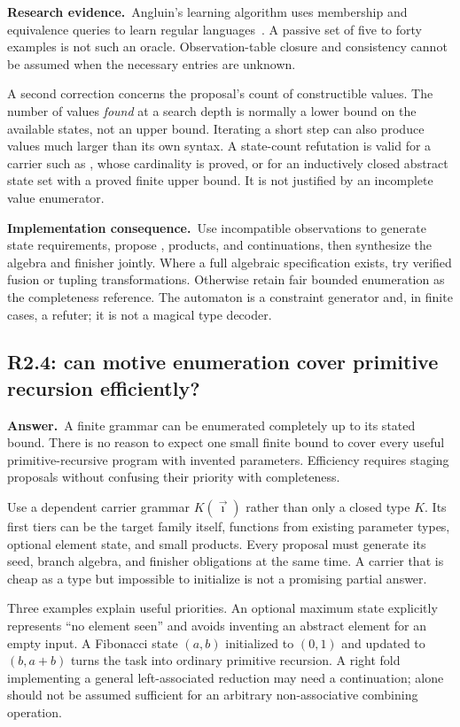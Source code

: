 \documentclass[11pt,a4paper]{article}
\theoremstyle{definition}
\theoremstyle{remark}
\newcommand{\code}[1]{\texttt{\detokenize{#1}}}
\newcommand{\ans}{\noindent\textbf{Answer.}\ }
\newcommand{\imp}{\par\noindent\textbf{Implementation consequence.}\ }
\newcommand{\lit}{\par\noindent\textbf{Research evidence.}\ }
\begin{document}
\lit Angluin's learning algorithm uses membership and equivalence queries to
learn regular languages~\cite{angluin}. A passive set of five to forty examples
is not such an oracle. Observation-table closure and consistency cannot be
assumed when the necessary entries are unknown.

A second correction concerns the proposal's count of constructible values.
The number of values \emph{found} at a search depth is normally a lower bound
on the available states, not an upper bound. Iterating a short step can also
produce values much larger than its own syntax. A state-count refutation is
valid for a carrier such as \code{Bool}, whose cardinality is proved, or for an
inductively closed abstract state set with a proved finite upper bound. It is
not justified by an incomplete value enumerator.

\imp Use incompatible observations to generate state requirements, propose
\code{Option}, products, and continuations, then synthesize the algebra and
finisher jointly. Where a full algebraic specification exists, try verified
fusion or tupling transformations. Otherwise retain fair bounded enumeration
as the completeness reference. The automaton is a constraint generator and,
in finite cases, a refuter; it is not a magical type decoder.

\subsection{R2.4: can motive enumeration cover primitive recursion efficiently?}\label{q:R2.4}
\ans A finite grammar can be enumerated completely up to its stated bound.
There is no reason to expect one small finite bound to cover every useful
primitive-recursive program with invented parameters. Efficiency requires
staging proposals without confusing their priority with completeness.

Use a dependent carrier grammar $K(\vec\imath)$ rather than only a closed type
$K$. Its first tiers can be the target family itself, functions from existing
parameter types, optional element state, and small products. Every proposal
must generate its seed, branch algebra, and finisher obligations at the same
time. A carrier that is cheap as a type but impossible to initialize is not a
promising partial answer.

Three examples explain useful priorities. An optional maximum state explicitly
represents ``no element seen'' and avoids inventing an abstract element for
an empty input. A Fibonacci state $(a,b)$ initialized to $(0,1)$ and updated to
$(b,a+b)$ turns the task into ordinary primitive recursion. A right fold
implementing a general left-associated reduction may need a continuation;
\code{Option A} alone should not be assumed sufficient for an arbitrary
non-associative combining operation.
\end{document}
